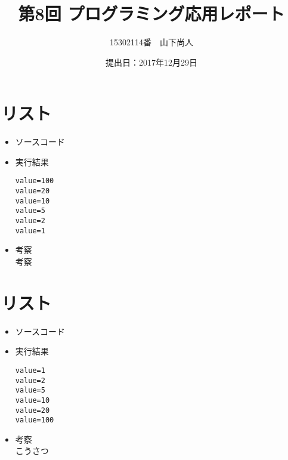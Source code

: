 \documentclass[a4paper]{jsarticle}
\title{第8回 プログラミング応用レポート}
\author{15302114番　山下尚人}
\date{提出日：2017年12月29日}
\begin{document}
\maketitle%

\section{リスト}
	\begin{itemize}
	\item ソースコード
		 
		\mbox{}\newline
	\item 実行結果
		\begin{lstlisting}
value=100
value=20
value=10
value=5
value=2
value=1
		\end{lstlisting}
		\mbox{}\newline
	\item 考察\mbox{}\\
		 考察
	\end{itemize}
	\newpage	%

\section{リスト}
	\begin{itemize}
	\item ソースコード
		 
		\mbox{}\newline
	\item 実行結果
		\begin{lstlisting}
value=1
value=2
value=5
value=10
value=20
value=100
		\end{lstlisting}
		\mbox{}\newline
	\item 考察\mbox{}\\
		こうさつ
	\end{itemize}
	\newpage	%
\end{document}
